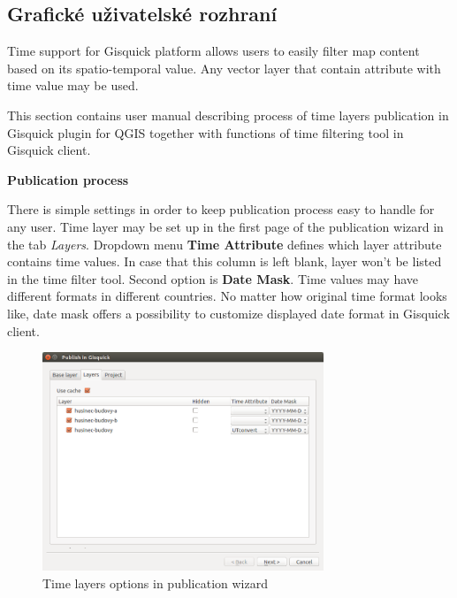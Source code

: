 \newpage
\subsection{Grafické uživatelské rozhraní}
\label{sssec:manual-gui}

Time support for Gisquick platform allows users to easily filter 
map content based on its spatio-temporal value. Any vector layer that 
contain attribute with time value may be used. 

This section contains user manual describing process of time layers 
publication in Gisquick plugin for QGIS together with functions of time
filtering tool in Gisquick client.  

\bigskip
\noindent \textbf{Publication process}

There is simple settings in order to keep publication process easy to 
handle for any user. Time layer may be set up in the first
page of the publication wizard in the tab \textit{Layers}.  Dropdown
menu \textbf{Time Attribute} defines which layer attribute contains
time values. In case that this column is left blank, layer won't be listed
in the time filter tool. Second option is \textbf{Date Mask}. Time
values may have different formats in different countries. No matter
how original time format looks like, date mask offers a possibility to
customize displayed date format in Gisquick client.

\begin{figure}[h!]
	\centering
	\includegraphics[width=0.75\textwidth]{../img/plugin-layers.png}
	\caption{Time layers options in publication wizard}
	\label{fig:publication-wizard-layers}
\end{figure}

